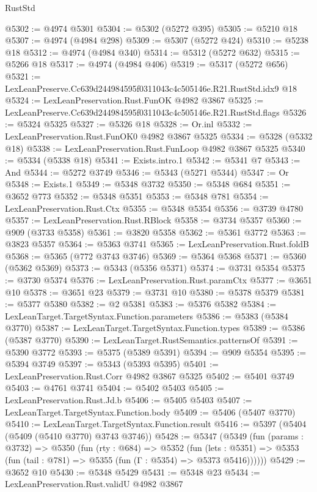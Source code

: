 \begin{lexlean}{RustStd}
\begin{coremodule}
@5302 := @4974 @5301
@5304 := @5302 (@5272 @395)
@5305 := @5210 @18
@5307 := @4974 (@4984 @298)
@5309 := @5307 (@5272 @424)
@5310 := @5238 @18
@5312 := @4974 (@4984 @340)
@5314 := @5312 (@5272 @632)
@5315 := @5266 @18
@5317 := @4974 (@4984 @406)
@5319 := @5317 (@5272 @656)
@5321 := LexLeanPreserve.Cc639d244984595f0311043c4c505146e.R21.RustStd.idx9 @18
@5324 := LexLeanPreservation.Rust.FunOK @4982 @3867
@5325 := LexLeanPreserve.Cc639d244984595f0311043c4c505146e.R21.RustStd.flags
@5326 := @5324 @5325
@5327 := @5326 @18
@5328 := Or.inl
@5332 := LexLeanPreservation.Rust.FunOK0 @4982 @3867 @5325
@5334 := @5328 (@5332 @18)
@5338 := LexLeanPreservation.Rust.FunLoop @4982 @3867 @5325
@5340 := @5334 (@5338 @18)
@5341 := Exists.intro.{1}
@5342 := @5341 @7
@5343 := And
@5344 := @5272 @3749
@5346 := @5343 (@5271 @5344)
@5347 := Or
@5348 := Exists.{1}
@5349 := @5348 @3732
@5350 := @5348 @684
@5351 := @3652 @773
@5352 := @5348 @5351
@5353 := @5348 @781
@5354 := LexLeanPreservation.Rust.Ctx
@5355 := @5348 @5354
@5356 := @3739 @4780
@5357 := LexLeanPreservation.Rust.RBlock
@5358 := @3734 @5357
@5360 := @909 (@3733 @5358)
@5361 := @3820 @5358
@5362 := @5361 @3772
@5363 := @3823 @5357
@5364 := @5363 @3741
@5365 := LexLeanPreservation.Rust.foldB
@5368 := @5365 (@772 @3743 @3746)
@5369 := @5364 @5368
@5371 := @5360 (@5362 @5369)
@5373 := @5343 (@5356 @5371)
@5374 := @3731 @5354
@5375 := @3730 @5374
@5376 := LexLeanPreservation.Rust.paramCtx
@5377 := @3651 @10
@5378 := @3651 @23
@5379 := @3731 @10
@5380 := @5378 @5379
@5381 := @5377 @5380
@5382 := @2 @5381
@5383 := @5376 @5382
@5384 := LexLeanTarget.TargetSyntax.Function.parameters
@5386 := @5383 (@5384 @3770)
@5387 := LexLeanTarget.TargetSyntax.Function.types
@5389 := @5386 (@5387 @3770)
@5390 := LexLeanTarget.RustSemantics.patternsOf
@5391 := @5390 @3772
@5393 := @5375 (@5389 @5391)
@5394 := @909 @5354
@5395 := @5394 @3749
@5397 := @5343 (@5393 @5395)
@5401 := LexLeanPreservation.Rust.Corr @4982 @3867 @5325
@5402 := @5401 @3749
@5403 := @4761 @3741
@5404 := @5402 @5403
@5405 := LexLeanPreservation.Rust.Jd.b
@5406 := @5405 @5403
@5407 := LexLeanTarget.TargetSyntax.Function.body
@5409 := @5406 (@5407 @3770)
@5410 := LexLeanTarget.TargetSyntax.Function.result
@5416 := @5397 (@5404 (@5409 (@5410 @3770) @3743 @3746))
@5428 := @5347
    (@5349
      (fun (params : @3732) =>
      @5350
        (fun (rty : @684) =>
        @5352
          (fun (lets : @5351) =>
          @5353 (fun (tail : @781) => @5355 (fun (Γ : @5354) => @5373 @5416))))))
@5429 := @3652 @10
@5430 := @5348 @5429
@5431 := @5348 @23
@5434 := LexLeanPreservation.Rust.validU @4982 @3867

\end{coremodule}
\end{lexlean}
